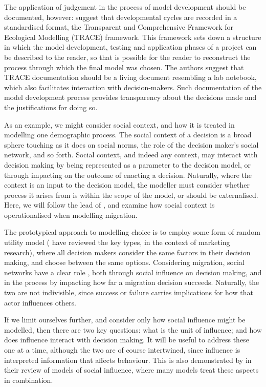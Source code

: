 \documentclass{article}
\begin{document}
The application of judgement in the process of model development should be documented, however: \cite{Schmolke2010} suggest that developmental cycles are recorded in a standardised format, the Transparent and Comprehensive Framework for Ecological Modelling (TRACE) framework. This framework sets down a structure in which the model development, testing and application phases of a project can be described to the reader, so that is possible for the reader to reconstruct the process through which the final model was chosen. The authors suggest that TRACE documentation should be a living document resembling a lab notebook, which also facilitates interaction with decision-makers. Such documentation of the model development process provides transparency about the decisions made and the justifications for doing so.

As an example, we might consider social context, and how it is treated in modelling one demographic process. The social context of a decision is a broad sphere touching as it does on social norms, the role of the decision maker's social network, and so forth. Social context, and indeed any context, may interact with decision making by being represented as a parameter to the decision model, or through impacting on the outcome of enacting a decision. Naturally, where the context is an input to the decision model, the modeller must consider whether process it arises from is within the scope of the model, or should be externalised.
Here, we will follow the lead of \citet{Klabunde}, and examine how social context is operationalised when modelling migration. 

The prototypical approach to modelling choice is to employ some form of random utility model (\citet{Baltas2001} have reviewed the key types, in the context of marketing research), where all decision makers consider the same factors in their decision making, and choose between the same options. Considering migration, social networks have a clear role \citep{Epstein2006}, both through social influence on decision making, and in the process by impacting how far a migration decision succeeds. Naturally, the two are not indivisible, since success or failure carries implications for how that actor influences others.

If we limit ourselves further, and consider only how social influence might be modelled, then there are two key questions: what is the unit of influence; and how does influence interact with decision making. It will be useful to address these one at a time, although the two are of course intertwined, since influence is interpreted information that affects behaviour. This is also demonstrated by \citet{Mason2007} in their review of models of social influence, where many models treat these aspects in combination.
\end{document}
